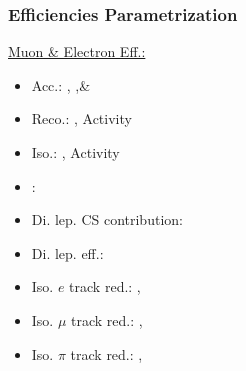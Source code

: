 \documentclass{beamer}
\begin{document}
\begin{frame}
 \frametitle{Efficiencies Parametrization}

 \underline{Muon \& Electron Eff.:}
 \begin{itemize}
  \item Acc.: \HT, \MHT ,\& \NJets
  \item Reco.: \pt, Activity
  \item Iso.: \pt, Activity
  \item \mt: \NJets
  \item Di. lep. CS contribution: \NJets
  \item Di. lep. eff.: \NJets
  \item Iso. $e$ track red.: \BTags, \NJets
  \item Iso. $\mu$ track red.: \BTags, \NJets
  \item Iso. $\pi$ track red.: \BTags, \NJets
 \end{itemize}
\end{frame}

\setcounter{framenumber}{27}
\end{document}

